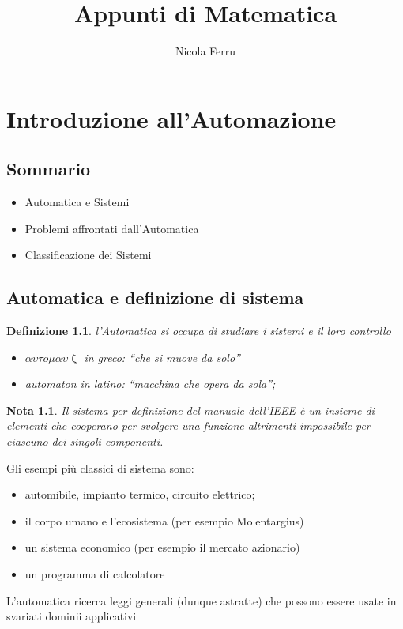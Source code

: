 \documentclass{book}
\title{Appunti di Matematica}
\author{Nicola Ferru}
\date{}
\newtheorem{nota}{Nota}
\newtheorem{defi}{Definizione}
\begin{document}


\tableofcontents
\listoftables
\listoffigures
\chapter{Introduzione all'Automazione}
\section{Sommario}
\begin{itemize}
    \item Automatica e Sistemi
    \item Problemi affrontati dall'Automatica
    \item Classificazione dei Sistemi
\end{itemize}
\section{Automatica e definizione di sistema}
\begin{defi}
  l'Automatica si occupa di studiare i sistemi e il loro controllo
  \begin{itemize}
    \item $\alpha\upsilon\tau o \mu\alpha\upsilon\upzeta$ in greco: ``che si muove da solo''
    \item \textit{automaton} in latino: ``macchina che opera da sola'';
  \end{itemize}
\end{defi}
\begin{nota}
  Il sistema per definizione del manuale dell'IEEE è un insieme di elementi che cooperano per
  svolgere una funzione altrimenti impossibile per ciascuno dei singoli componenti.
\end{nota}
Gli esempi più classici di sistema sono:
\begin{itemize}
    \item automibile, impianto termico, circuito elettrico;
    \item il corpo umano e l'ecosistema (per esempio Molentargius)
    \item un sistema economico (per esempio il mercato azionario)
    \item un programma di calcolatore
\end{itemize}
L'automatica ricerca leggi generali (dunque astratte) che possono essere usate in svariati dominii applicativi
\end{document}
